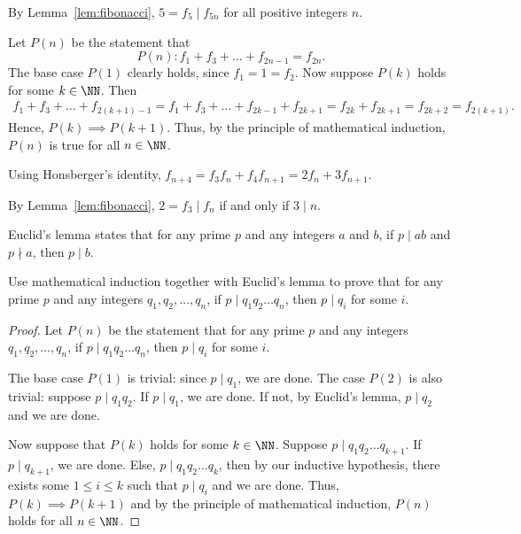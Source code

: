 \begin{solution}
    \begin{ppart}
        By Lemma~\ref{lem:fibonacci}, $5 = f_5 \mid f_{5n}$ for all positive integers $n$.
    \end{ppart}
    \begin{ppart}
        Let $P(n)$ be the statement that \[P(n) : f_1 + f_3 + \dots + f_{2n-1} = f_{2n}.\] The base case $P(1)$ clearly holds, since $f_1 = 1 = f_2$. Now suppose $P(k)$ holds for some $k \in \NN$. Then
        \begin{gather*}
            f_1 + f_3 + \dots + f_{2(k+1) - 1} = f_1 + f_3 + \dots + f_{2k-1} + f_{2k+1} = f_{2k} + f_{2k+1} = f_{2k+2} = f_{2(k+1)}.
        \end{gather*}
        Hence, $P(k) \implies P(k+1)$. Thus, by the principle of mathematical induction, $P(n)$ is true for all $n \in \NN$.
    \end{ppart}
    \begin{ppart}
        Using Honsberger's identity, $f_{n+4} = f_3 f_n + f_4 f_{n+1} = 2 f_n + 3 f_{n+1}$.
    \end{ppart}
    \begin{ppart}
        By Lemma~\ref{lem:fibonacci}, $2 = f_3 \mid f_{n}$ if and only if $3 \mid n$.
    \end{ppart}
\end{solution}

\begin{problem}
    Euclid's lemma states that for any prime $p$ and any integers $a$ and $b$, if $p \mid ab$ and $p \nmid a$, then $p \mid b$.

    Use mathematical induction together with Euclid's lemma to prove that for any prime $p$ and any integers $q_1, q_2, \dots, q_n$, if $p \mid q_1 q_2 \dots q_n$, then $p \mid q_i$ for some $i$.
\end{problem}
\begin{proof}
    Let $P(n)$ be the statement that for any prime $p$ and any integers $q_1, q_2, \dots, q_n$, if $p \mid q_1 q_2 \dots q_n$, then $p \mid q_i$ for some $i$.

    The base case $P(1)$ is trivial: since $p \mid q_1$, we are done. The case $P(2)$ is also trivial: suppose $p \mid q_1 q_2$. If $p \mid q_1$, we are done. If not, by Euclid's lemma, $p \mid q_2$ and we are done.

    Now suppose that $P(k)$ holds for some $k \in \NN$. Suppose $p \mid q_1 q_2 \dots q_{k+1}$. If $p \mid q_{k+1}$, we are done. Else, $p \mid q_1 q_2 \dots q_k$, then by our inductive hypothesis, there exists some $1 \leq i \leq k$ such that $p \mid q_i$ and we are done. Thus, $P(k) \implies P(k+1)$ and by the principle of mathematical induction, $P(n)$ holds for all $n \in \NN$.
\end{proof}

